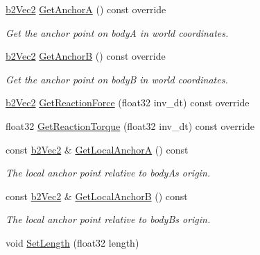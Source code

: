 \begin{DoxyCompactItemize}
\hyperlink{structb2Vec2}{b2\+Vec2} \hyperlink{classb2DistanceJoint_ae228d3ce27009acd8a20c2570fb1183c}{Get\+AnchorA} () const override
\begin{DoxyCompactList}\small\item\em Get the anchor point on bodyA in world coordinates. \end{DoxyCompactList}\item 
\mbox{\label{classb2DistanceJoint_a05bf71de10904c87e3a5295aa04a8aa6}} 
\hyperlink{structb2Vec2}{b2\+Vec2} \hyperlink{classb2DistanceJoint_a05bf71de10904c87e3a5295aa04a8aa6}{Get\+AnchorB} () const override
\begin{DoxyCompactList}\small\item\em Get the anchor point on bodyB in world coordinates. \end{DoxyCompactList}\item 
\hyperlink{structb2Vec2}{b2\+Vec2} \hyperlink{classb2DistanceJoint_a6aa951e5bbfcae8a617987955cadbed5}{Get\+Reaction\+Force} (float32 inv\+\_\+dt) const override
\item 
float32 \hyperlink{classb2DistanceJoint_ad7ac78c4c20c122b944947d523a02982}{Get\+Reaction\+Torque} (float32 inv\+\_\+dt) const override
\item 
\mbox{\label{classb2DistanceJoint_aaa881128071c62f21898a75d5b20308a}} 
const \hyperlink{structb2Vec2}{b2\+Vec2} \& \hyperlink{classb2DistanceJoint_aaa881128071c62f21898a75d5b20308a}{Get\+Local\+AnchorA} () const
\begin{DoxyCompactList}\small\item\em The local anchor point relative to bodyA\textquotesingle{}s origin. \end{DoxyCompactList}\item 
\mbox{\label{classb2DistanceJoint_a214a1cca8854613d7401c9a5892a28c9}} 
const \hyperlink{structb2Vec2}{b2\+Vec2} \& \hyperlink{classb2DistanceJoint_a214a1cca8854613d7401c9a5892a28c9}{Get\+Local\+AnchorB} () const
\begin{DoxyCompactList}\small\item\em The local anchor point relative to bodyB\textquotesingle{}s origin. \end{DoxyCompactList}\item 
void \hyperlink{classb2DistanceJoint_a950a0f187ef691208e50de40ed9223fe}{Set\+Length} (float32 length)

\end{DoxyCompactItemize}
